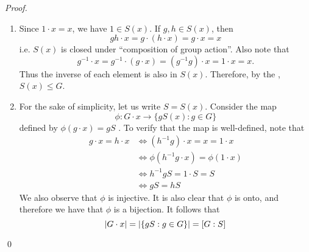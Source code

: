 \begin{proof}
  \begin{enumerate}
    \item Since $1 \cdot x = x$, we have $1 \in S(x)$. If $g, h \in S(x)$, then
      \begin{equation*}
        gh \cdot x = g \cdot (h \cdot x) = g \cdot x = x
      \end{equation*}
      i.e. $S(x)$ is closed under ``composition of group action''. Also note that
      \begin{equation*}
        g^{-1} \cdot x = g^{-1} \cdot (g \cdot x) = (g^{-1}g) \cdot x = 1 \cdot x = x.
      \end{equation*}
      Thus the inverse of each element is also in $S(x)$. Therefore, by the , $S(x) \leq G$.

    \item For the sake of simplicity, let us write $S = S(x)$. Consider the map
      \begin{equation*}
        \phi: G \cdot x \to \{g S(x) : g \in G\}
      \end{equation*}
      defined by $\phi(g \cdot x) = gS$ . To verify that the map is well-defined, note that
      \begin{align*}
        g \cdot x = h \cdot x &\iff (h^{-1} g) \cdot x = x = 1 \cdot x \\
                              &\iff \phi(h^{-1} g \cdot x) = \phi( 1 \cdot x ) \\
                              &\iff h^{-1}g S = 1 \cdot S = S \\
                              &\iff gS = hS
      \end{align*}
      We also observe that $\phi$ is injective. It is also clear that $\phi$ is onto, and therefore we have that $\phi$ is a bijection. It follows that
      \begin{equation*}
        \left|G \cdot x\right| = \left| \{gS : g \in G \} \right| = [G : S]
      \end{equation*}
  \end{enumerate}\qed
\end{proof}

